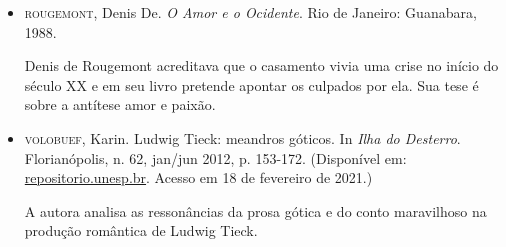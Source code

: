 \documentclass[12pt]{extarticle}
\begin{document}
\begin{itemize}
\item\textsc{rougemont}, Denis De. \textit{O Amor e o Ocidente}. Rio de Janeiro:
Guanabara, 1988.

Denis de Rougemont acreditava que o casamento vivia uma crise no início
do século XX e em seu livro pretende apontar os culpados por ela. Sua
tese é sobre a antítese amor e paixão.

\item\textsc{volobuef}, Karin. Ludwig Tieck: meandros góticos. In \emph{Ilha
do Desterro}. Florianópolis, n. 62, jan/jun 2012, p. 153-172.
(Disponível em:
\href{https://repositorio.unesp.br/bitstream/handle/11449/73913/2-s2.0-84872003268.pdf?sequence=1\&isAllowed=y}%
{repositorio.unesp.br}.
Acesso em 18 de fevereiro de 2021.)

A autora analisa as ressonâncias da prosa gótica e do conto maravilhoso
na produção romântica de Ludwig Tieck.
\end{itemize}
\end{document}
